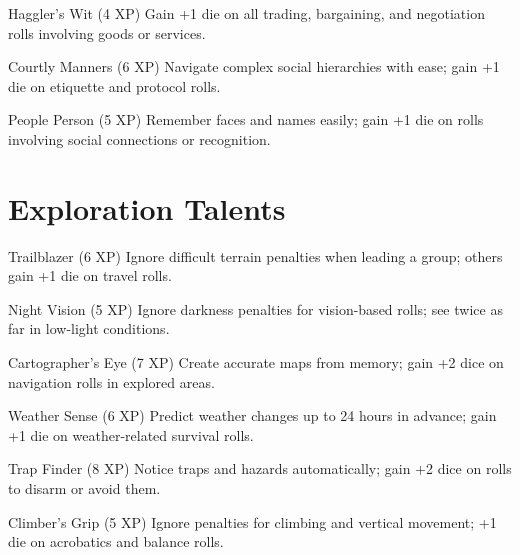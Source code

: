 \documentclass[11pt]{article}
\begin{document}
\begin{talentbox}{Haggler's Wit (4 XP)}
Gain +1 die on all trading, bargaining, and negotiation rolls involving goods or services.
\end{talentbox}

\begin{talentbox}{Courtly Manners (6 XP)}
Navigate complex social hierarchies with ease; gain +1 die on etiquette and protocol rolls.
\end{talentbox}

\begin{talentbox}{People Person (5 XP)}
Remember faces and names easily; gain +1 die on rolls involving social connections or recognition.
\end{talentbox}

\section*{Exploration Talents}

\begin{talentbox}{Trailblazer (6 XP)}
Ignore difficult terrain penalties when leading a group; others gain +1 die on travel rolls.
\end{talentbox}

\begin{talentbox}{Night Vision (5 XP)}
Ignore darkness penalties for vision-based rolls; see twice as far in low-light conditions.
\end{talentbox}

\begin{talentbox}{Cartographer's Eye (7 XP)}
Create accurate maps from memory; gain +2 dice on navigation rolls in explored areas.
\end{talentbox}

\begin{talentbox}{Weather Sense (6 XP)}
Predict weather changes up to 24 hours in advance; gain +1 die on weather-related survival rolls.
\end{talentbox}

\begin{talentbox}{Trap Finder (8 XP)}
Notice traps and hazards automatically; gain +2 dice on rolls to disarm or avoid them.
\end{talentbox}

\begin{talentbox}{Climber's Grip (5 XP)}
Ignore penalties for climbing and vertical movement; +1 die on acrobatics and balance rolls.
\end{talentbox}
\end{document}
